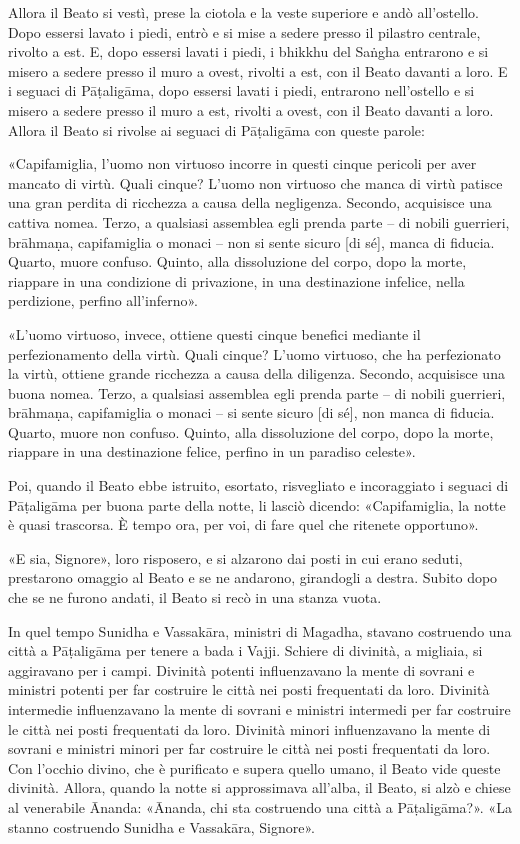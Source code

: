 Allora il Beato si vestì, prese la ciotola e la veste superiore e andò
all’ostello. Dopo essersi lavato i piedi, entrò e si mise a sedere
presso il pilastro centrale, rivolto a est. E, dopo essersi lavati i
piedi, i bhikkhu del Saṅgha entrarono e si misero a sedere presso il
muro a ovest, rivolti a est, con il Beato davanti a loro. E i seguaci di
Pāṭaligāma, dopo essersi lavati i piedi, entrarono nell’ostello e si
misero a sedere presso il muro a est, rivolti a ovest, con il Beato
davanti a loro. Allora il Beato si rivolse ai seguaci di Pāṭaligāma con
queste parole:


«Capifamiglia, l’uomo non virtuoso incorre in questi cinque pericoli per
aver mancato di virtù. Quali cinque? L’uomo non virtuoso che manca di
virtù patisce una gran perdita di ricchezza a causa della negligenza.
Secondo, acquisisce una cattiva nomea. Terzo, a qualsiasi assemblea egli
prenda parte – di nobili guerrieri, brāhmaṇa, capifamiglia o monaci –
non si sente sicuro [di sé], manca di fiducia. Quarto, muore confuso.
Quinto, alla dissoluzione del corpo, dopo la morte, riappare in una
condizione di privazione, in una destinazione infelice, nella
perdizione, perfino all’inferno».


«L’uomo virtuoso, invece, ottiene questi cinque benefici mediante il
perfezionamento della virtù. Quali cinque? L’uomo virtuoso, che ha
perfezionato la virtù, ottiene grande ricchezza a causa della diligenza.
Secondo, acquisisce una buona nomea. Terzo, a qualsiasi assemblea egli
prenda parte – di nobili guerrieri, brāhmaṇa, capifamiglia o monaci – si
sente sicuro [di sé], non manca di fiducia. Quarto, muore non confuso.
Quinto, alla dissoluzione del corpo, dopo la morte, riappare in una
destinazione felice, perfino in un paradiso celeste».


Poi, quando il Beato ebbe istruito, esortato, risvegliato e incoraggiato
i seguaci di Pāṭaligāma per buona parte della notte, li lasciò dicendo:
«Capifamiglia, la notte è quasi trascorsa. È tempo ora, per voi, di fare
quel che ritenete opportuno».


«E sia, Signore», loro risposero, e si alzarono dai posti in cui erano
seduti, prestarono omaggio al Beato e se ne andarono, girandogli a
destra. Subito dopo che se ne furono andati, il Beato si recò in una
stanza vuota.


In quel tempo Sunidha e Vassakāra, ministri di Magadha, stavano
costruendo una città a Pāṭaligāma per tenere a bada i Vajji. Schiere di
divinità, a migliaia, si aggiravano per i campi. Divinità potenti
influenzavano la mente di sovrani e ministri potenti per far costruire
le città nei posti frequentati da loro. Divinità intermedie
influenzavano la mente di sovrani e ministri intermedi per far costruire
le città nei posti frequentati da loro. Divinità minori influenzavano la
mente di sovrani e ministri minori per far costruire le città nei posti
frequentati da loro. Con l’occhio divino, che è purificato e supera
quello umano, il Beato vide queste divinità. Allora, quando la notte si
approssimava all’alba, il Beato, si alzò e chiese al venerabile Ānanda:
«Ānanda, chi sta costruendo una città a Pāṭaligāma?». «La stanno
costruendo Sunidha e Vassakāra, Signore».


